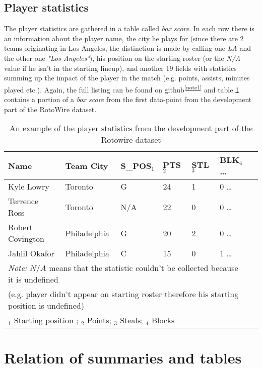\subsection{Player statistics}

The player statistics are gathered in a table called \emph{box score}. In each row there is an information about the player name, the city he plays for (since there are 2 teams originating in Los Angeles, the distinction is made by calling one \emph{LA} and the other one \emph{"Los Angeles"}), his position on the starting roster (or the \emph{N/A} value if he isn't in the starting lineup), and another 19 fields with statistics summing up the impact of the player in the match (e.g. points, assists, minutes played etc.). Again, the full listing can be found on github\textsuperscript{\ref{note1}} and table \ref{table:players_stats} contains a portion of a \emph{box score} from the first data-point from the development part of the RotoWire dataset.

\begin{table}[h!]
    \begin{tabular}{lllllll}
        \toprule
        Name             & Team City    & S\_POS$_1$ & PTS$_2$ & STL$_3$ & BLK$_4$        \dots \\
        \midrule
        Kyle Lowry       & Toronto      & G         & 24  & 1   & 0       \dots \\
        Terrence Ross    & Toronto      & N/A       & 22  & 0   & 0        \dots \\
        Robert Covington & Philadelphia & G         & 20  & 2   & 0        \dots \\
        Jahlil Okafor    & Philadelphia & C         & 15  & 0   & 1        \dots \\
        \bottomrule
        \multicolumn{6}{l}{\footnotesize \textit{Note:} $N/A$ means that the statistic couldn't be collected because it is undefined} \\
        \multicolumn{6}{l}{\footnotesize (e.g. player didn't appear on starting roster therefore his starting position is undefined)} \\
        \multicolumn{6}{l}{\footnotesize $_1$ Starting position ; $_2$ Points; $_3$ Steals; $_4$ Blocks}
    \end{tabular}
    \caption{\centering An example of the player statistics from the development part of the Rotowire dataset}\label{table:players_stats}
\end{table}

\section{Relation of summaries and tables}

